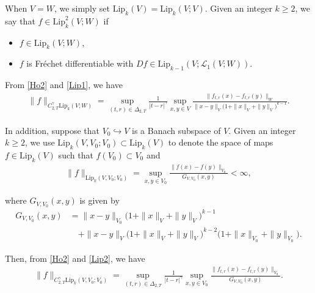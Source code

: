 \documentclass[letterpaper, 11pt,  reqno]{amsart}
\newcommand{\1}{\hspace{0.5mm}\text{I}\hspace{0.5mm}}
\newcommand{\noi}{\noindent}
\newcommand{\Dl}{\Delta}
\newcommand{\g}{\gamma}
\newcommand{\N}{\mathbb{N}}
\newcommand{\cL}{\mathcal{L}}
\newcommand{\Lip}{\mathrm{Lip}}
\numberwithin{equation}{section}
\numberwithin{theorem}{section}
\begin{document}
\noi
When $V = W$, 
we simply set $\Lip_k(V)= \Lip_k(V;V)$.
Given an integer $k \ge 2$, 
we say that $f\in\Lip^2_k(V; W)$ 
if 
\smallskip

\begin{itemize}
\item[(i)] $f\in\Lip_k(V; W)$, 


\smallskip
\item[(ii)]
 $f$ is Fr\'echet differentiable 
with 
$Df \in \Lip_{k-1}(V;\cL_1(V; W))$.


\end{itemize}





\smallskip

\noi
From \eqref{Ho2} and \eqref{Lip1}, we have 
\begin{align}
\|f \|_{C^\g_{2, T}\Lip_k(V;W)}
= \sup_{(t,r) \in \Dl_{2,T}}
\frac 1{|t-r|^{\g}}
\sup_{x,y\in V} 
\frac{\| f_{t, r}(x)- f_{t, r}(y)\|_W}{\|x-y\|_V \big(1+\|x\|_V+\|y\|_V\big)^{k-1}}.
\label{Ho3}
\end{align}


\noi
In addition, suppose that $V_0 \hookrightarrow V$
is a Banach subspace of $V$.
Given an integer $k \ge 2$, %
we  use $\Lip_k(V, V_0; V_0)\subset  \Lip_k(V)$ 
to denote the space of maps $f\in\Lip_k(V)$
such that $f(V_0)\subset V_0$ and
\begin{align}
\|f\|_{\Lip_k(V, V_0; V_0)}
= 
\sup_{x,y\in V_0} 
\frac{\|f(x)-f(y)\|_{V_0}}
{G_{V, V_0}(x, y)}
<\infty , 
\label{Lip2}
\end{align}

\noi
where $G_{V, V_0}(x, y)$ is given by 
\begin{align*}
G_{V, V_0}(x, y)
& = \|x-y\|_{V_0} \big(1+\|x\|_{V}+\|y\|_{V}\big)^{k-1}\\
& \quad + \|x-y\|_{V} \big(1+\|x\|_{V}+\|y\|_{V}\big)^{k-2}
 \big(1+\|x\|_{V_0}+\|y\|_{V_0}\big).
\end{align*}

\noi
Then, 
from \eqref{Ho2} and \eqref{Lip2}, we have 
\begin{align}
\|f \|_{C^\g_{2, T}\Lip_k(V, V_0; V_0)}
= \sup_{(t,r) \in \Dl_{2,T}}
\frac 1{|t-r|^{\g}}
\sup_{x,y\in V_0} 
\frac{\| f_{t, r}(x)- f_{t, r}(y)\|_{V_0}}{
G_{V, V_0}(x, y)}.
\label{Ho4}
\end{align}
\end{document}
